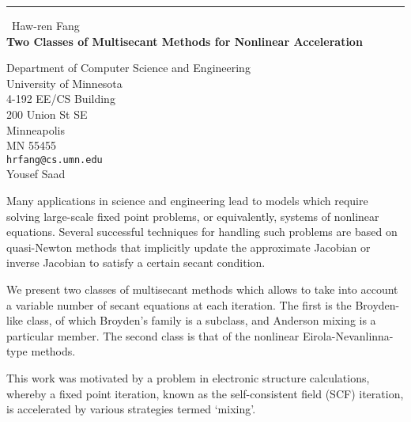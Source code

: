 \documentclass{report}
\begin{document}
\begin{center}
\rule{6in}{1pt} \
{\large Haw-ren Fang \\
{\bf Two Classes of Multisecant Methods for Nonlinear Acceleration}}

Department of Computer Science and Engineering \\ University of Minnesota \\ 4-192 EE/CS Building \\ 200 Union St SE \\ Minneapolis \\ MN 55455
\\
{\tt hrfang@cs.umn.edu}\\
Yousef Saad\end{center}

Many applications in science and engineering lead to models which require
solving large-scale fixed point problems, or equivalently, systems of
nonlinear equations. Several successful techniques for handling such
problems are based on quasi-Newton methods that implicitly update the
approximate Jacobian or inverse Jacobian to satisfy a certain secant
condition.

We present two classes of multisecant methods which allows to take
into account a variable number of secant equations at each iteration. The
first is the Broyden-like class, of which Broyden's family is a subclass,
and Anderson mixing is a particular member. The second class is that of
the nonlinear Eirola-Nevanlinna-type methods.

This work was motivated by a problem in electronic structure
calculations, whereby a fixed point iteration, known as the
self-consistent field (SCF) iteration, is accelerated by various
strategies termed `mixing'.
\end{document}
